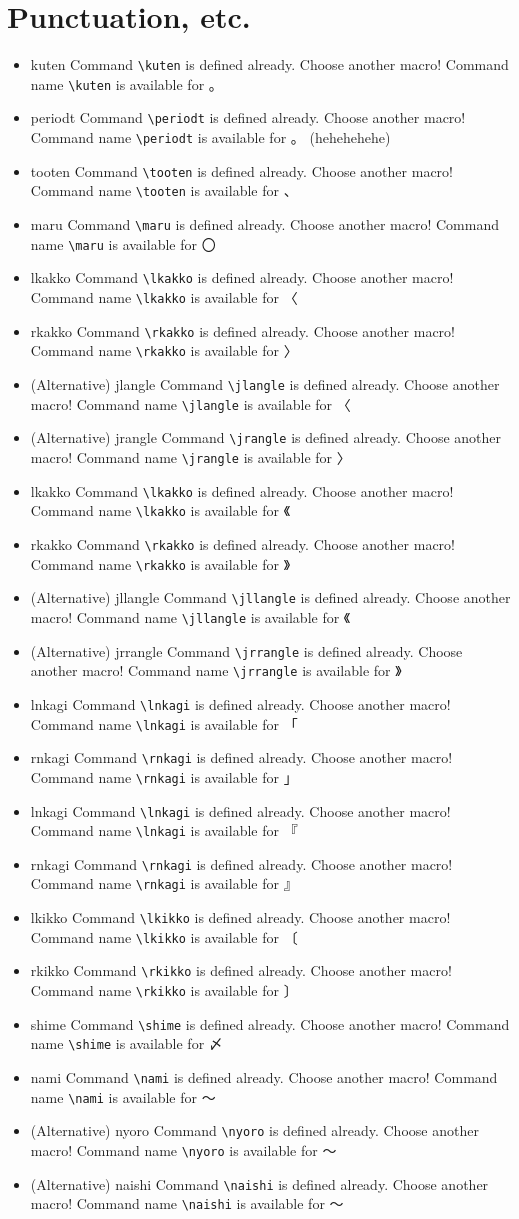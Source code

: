 \documentclass{article}
\newcommand{\checkfor}[1]{%
  \ifcsname#1\endcsname%
    Command \texttt{\textbackslash#1} is defined already. Choose
    another macro!
  \else%
    Command name \texttt{\textbackslash#1} is available for
  \fi%
}
\begin{document}
\section{Punctuation, etc.}
\begin{itemize}
  \item \checkfor{kuten} 。
  \item \checkfor{periodt} 。 (hehehehehe)
  \item \checkfor{tooten} 、
  \item \checkfor{maru} 〇
  \item \checkfor{lkakko} 〈
  \item \checkfor{rkakko} 〉
  \item (Alternative) \checkfor{jlangle} 〈
  \item (Alternative) \checkfor{jrangle} 〉
  \item \checkfor{lkakko} 《
  \item \checkfor{rkakko} 》
  \item (Alternative) \checkfor{jllangle} 《
  \item (Alternative) \checkfor{jrrangle} 》
  \item \checkfor{lnkagi} 「
  \item \checkfor{rnkagi} 」
  \item \checkfor{lnkagi} 『
  \item \checkfor{rnkagi} 』
  \item \checkfor{lkikko} 〔
  \item \checkfor{rkikko} 〕
  \item \checkfor{shime} 〆
  \item \checkfor{nami} ～
  \item (Alternative) \checkfor{nyoro} ～
  \item (Alternative) \checkfor{naishi} ～
\end{itemize}
\end{document}
